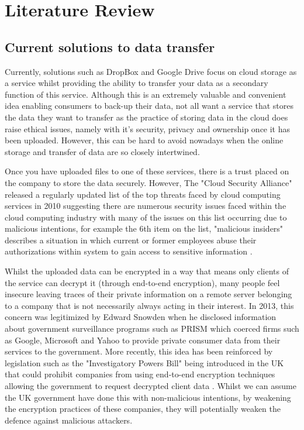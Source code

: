 \documentclass[]{report}
\begin{document}
	\section{Literature Review}
		\subsection*{Current solutions to data transfer}
			Currently, solutions such as DropBox and Google Drive focus on cloud storage as a service whilst providing the ability to transfer your data as a secondary function of this service. Although this is an extremely valuable and convenient idea enabling consumers to back-up their data, not all want a service that stores the data they want to transfer as the practice of storing data in the cloud does raise ethical issues, namely with it's security, privacy and ownership once it has been uploaded. However, this can be hard to avoid nowadays when the online storage and transfer of data are so closely intertwined.
			
			Once you have uploaded files to one of these services, there is a trust placed on the company to store the data securely. However, The "Cloud Security Alliance" released a regularly updated list of the top threats faced by cloud computing services in 2010 suggesting there are numerous security issues faced within the cloud computing industry with many of the issues on this list occurring due to malicious intentions, for example the 6th item on the list, "malicious insiders" describes a situation in which current or former employees abuse their authorizations within system to gain access to sensitive information \cite{CSA Top Threats}.
		 
		 	Whilst the uploaded data can be encrypted in a way that means only clients of the service can decrypt it (through end-to-end encryption), many people feel insecure leaving traces of their private information on a remote server belonging to a company that is not necessarily always acting in their interest. In 2013, this concern was legitimized by Edward Snowden when he disclosed information about government surveillance programs such as PRISM which coerced firms such as Google, Microsoft and Yahoo to provide private consumer data from their services to the government.\cite{PRISM}  More recently, this idea has been reinforced by legislation such as the "Investigatory Powers Bill" being introduced in the UK that could prohibit companies from using end-to-end encryption techniques allowing the government to request decrypted client data \cite{IPB Encryption}. Whilst we can assume the UK government have done this with non-malicious intentions, by weakening the encryption practices of these companies, they will potentially weaken the defence against malicious attackers.
			
\end{document}
